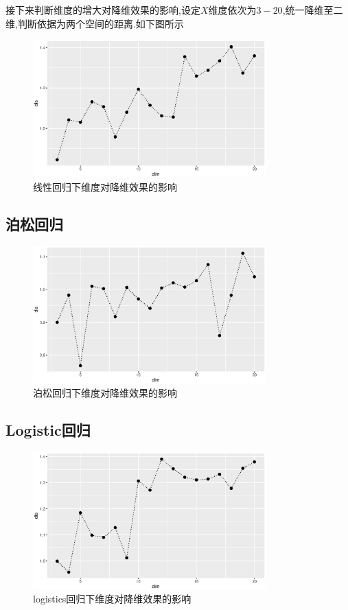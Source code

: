 接下来判断维度的增大对降维效果的影响,设定$X$维度依次为$3-20$,统一降维至二维,判断依据为两个空间的距离.如下图所示
\begin{figure}[H]
    \centering
    \includegraphics[width=0.8\textwidth]{image/norm.eps} 
    \caption{线性回归下维度对降维效果的影响}
\end{figure}


\subsection{泊松回归}
\begin{figure}[H]
    \centering
    \includegraphics[width=0.8\textwidth]{image/pois_phd.eps}
    \caption{泊松回归下维度对降维效果的影响}
\end{figure}

\subsection{Logistic回归}

\begin{figure}[H]
    \centering
    \includegraphics[width=0.8\textwidth]{image/logit_phd.eps}
    \caption{logistics回归下维度对降维效果的影响}
\end{figure}

